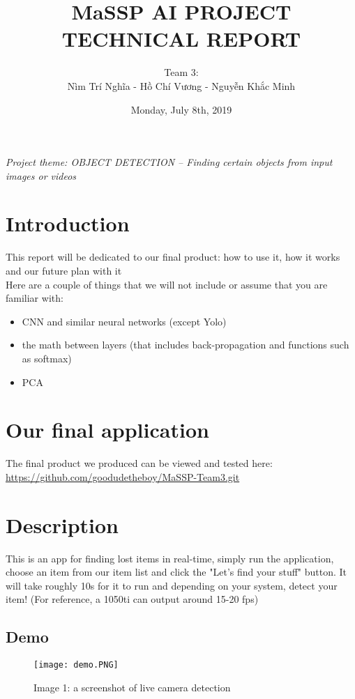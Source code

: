 \documentclass{article}
\title{\textbf{MaSSP AI PROJECT TECHNICAL REPORT}}
\author{Team 3:\\
Nìm Trí Nghĩa - Hồ Chí Vương - Nguyễn Khắc Minh}
\date{Monday, July 8th, 2019}
\begin{document}
\maketitle
\newpage
\tableofcontents
\newpage
\textit{Project theme: OBJECT DETECTION – Finding certain objects from input images or videos} 
\graphicspath{ {./images/} }

\section{Introduction}
\tab This report will be dedicated to our final product: how to use it, how it works and our future plan with it\\
Here are a couple of things that we will not include or assume that you are familiar with:
\begin{itemize}
	\item CNN and similar neural networks (except Yolo)
	\item the math between layers (that includes back-propagation and functions such as softmax)
	\item PCA
	
\end{itemize}


\section{Our final application}
The final product we produced can be viewed and tested here: \url{https://github.com/goodudetheboy/MaSSP-Team3.git}

\section{Description}
\tab This is an app for finding lost items in real-time, simply run the application, choose an item from our item list and click the "Let's find your stuff" button. It will take roughly 10s for it to run and depending on your system, detect your item! (For reference, a 1050ti can output around 15-20 fps)

\newpage
\subsection{Demo}
\begin{figure}[h!]
	\centerline{\texttt{[image: demo.PNG]}}
	\caption*{Image 1: a screenshot of live camera detection}
\end{figure}
\end{document}

